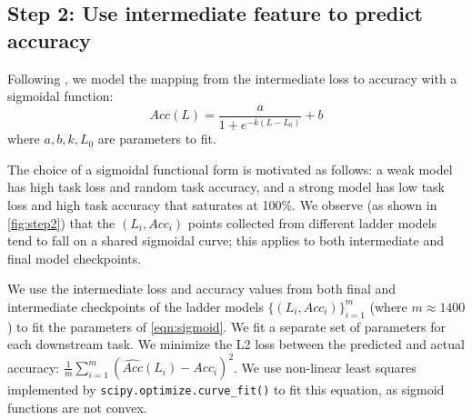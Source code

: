 
% 


\subsection{Step 2: Use intermediate feature to predict accuracy}
\label{sec:loss_to_acc}



Following \citet{Dubey2024TheL3}, we model the mapping from the intermediate loss to accuracy with a sigmoidal function:
\begin{equation}
    Acc(L) = \frac{a}{1 + e^{-k(L-L_0)}} + b
\label{eqn:sigmoid}
\end{equation}
where $a, b, k, L_0$ are parameters to fit.

The choice of a sigmoidal functional form is motivated as follows: a weak model has high task loss and random task accuracy, and a strong model has low task loss and high task accuracy that saturates at 100\%.
We observe (as shown in \autoref{fig:step2}) that the $(L_i, Acc_i)$ points collected from different ladder models tend to fall on a shared sigmoidal curve; this applies to both intermediate and final model checkpoints. 

We use the intermediate loss and accuracy values from both final and intermediate checkpoints of the ladder models $\{ (L_i, Acc_i) \}_{i=1}^m$ (where $m \approx 1400$) to fit the parameters of \autoref{eqn:sigmoid}.
We fit a separate set of parameters for each downstream task.
We minimize the L2 loss between the predicted and actual accuracy: $\frac{1}{m} \sum_{i=1}^{m}(\hat{Acc}(L_i) - Acc_i)^2$.
We use non-linear least squares implemented by \texttt{scipy.optimize.curve\_fit()} to fit this equation, as sigmoid functions are not convex. 

